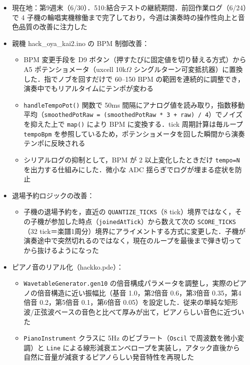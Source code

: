 \documentclass[a4paper,11pt]{ltjsarticle}
\providecommand{\％}{\%}
\begin{document}
\begin{itemize}
    \item 現在地：第9週末（6/30）．510:結合テストの継続期間．前回作業ログ（6/24）で 4 子機の輪唱実機稼働まで完了しており，今週は演奏時の操作性向上と音色品質の改善に注力した
    \item 親機 hack\_oya\_kai2.ino の BPM 制御改善：
    \begin{itemize}
        \item BPM 変更手段を D9 ボタン（押すたびに固定値を切り替える方式）から A5 ポテンショメータ（uxcell 10k$\Omega$ シングルターン可変抵抗器）に置換した．指でノブを回すだけで 60--150 BPM の範囲を連続的に調整でき，演奏中でもリアルタイムにテンポが変わる
        \item \texttt{handleTempoPot()} 関数で 50ms 間隔にアナログ値を読み取り，指数移動平均（\texttt{smoothedPotRaw = (smoothedPotRaw * 3 + raw) / 4}）でノイズを抑えた上で \texttt{map()} により BPM に変換する．tick 周期計算は毎ループ \texttt{tempoBpm} を参照しているため，ポテンショメータを回した瞬間から演奏テンポに反映される
        \item シリアルログの抑制として，BPM が 2 以上変化したときだけ \texttt{tempo=N} を出力する仕組みにした．微小な ADC 揺らぎでログが埋まる症状を防止
    \end{itemize}
    \item 退場予約ロジックの改善：
    \begin{itemize}
        \item 子機の退場予約を，直近の \texttt{QUANTIZE\_TICKS}（8 tick）境界ではなく，その子機が参加した時点（\texttt{joinedAtTick}）から数えて次の \texttt{SCORE\_TICKS}（32 tick＝楽譜1周分）境界にアライメントする方式に変更した．子機が演奏途中で突然切れるのではなく，現在のループを最後まで弾き切ってから抜けるようになった
    \end{itemize}
    \item ピアノ音のリアル化（hackko.pde）：
    \begin{itemize}
        \item \texttt{WavetableGenerator.gen10} の倍音構成パラメータを調整し，実際のピアノの倍音構造に近い振幅比（基音 1.0，第2倍音 0.6，第3倍音 0.35，第4倍音 0.2，第5倍音 0.1，第6倍音 0.05）を設定した．従来の単純な矩形波/正弦波ベースの音色と比べて厚みが出て，ピアノらしい音色に近づいた
        \item \texttt{PianoInstrument} クラスに 5Hz のビブラート（\texttt{Oscil} で周波数を微小変調）と \texttt{Line} による線形減衰エンベロープを実装し，アタック直後から自然に音量が減衰するピアノらしい発音特性を再現した

\end{itemize}
\end{itemize}
\end{document}
